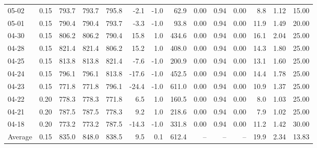 \begin{threeparttable}
{\begin{tabular}{lrrrrrrrrrrrrr}
  05-02 &     0.15 & 793.7 &  793.7 & 795.8 &       -2.1 &                     -1.0 &                62.9 &       0.00 &      0.94 &           0.00 &              8.8 &            1.12 &                  15.00 \\
  05-01 &     0.15 & 790.4 &  790.4 & 793.7 &       -3.3 &                     -1.0 &                93.8 &       0.00 &      0.94 &           0.00 &             11.9 &            1.49 &                  20.00 \\
  04-30 &     0.15 & 806.2 &  806.2 & 790.4 &       15.8 &                      1.0 &               434.6 &       0.00 &      0.94 &           0.00 &             16.1 &            2.04 &                  25.00 \\
  04-28 &     0.15 & 821.4 &  821.4 & 806.2 &       15.2 &                      1.0 &               408.0 &       0.00 &      0.94 &           0.00 &             14.3 &            1.80 &                  25.00 \\
  04-25 &     0.15 & 813.8 &  813.8 & 821.4 &       -7.6 &                     -1.0 &               200.9 &       0.00 &      0.94 &           0.00 &             13.1 &            1.60 &                  25.00 \\
  04-24 &     0.15 & 796.1 &  796.1 & 813.8 &      -17.6 &                     -1.0 &               452.5 &       0.00 &      0.94 &           0.00 &             14.4 &            1.78 &                  25.00 \\
  04-23 &     0.15 & 771.8 &  771.8 & 796.1 &      -24.4 &                     -1.0 &               611.0 &       0.00 &      0.94 &           0.00 &             10.9 &            1.37 &                  25.00 \\
  04-22 &     0.20 & 778.3 &  778.3 & 771.8 &        6.5 &                      1.0 &               160.5 &       0.00 &      0.94 &           0.00 &              8.0 &            1.03 &                  25.00 \\
  04-21 &     0.20 & 787.5 &  787.5 & 778.3 &        9.2 &                      1.0 &               218.6 &       0.00 &      0.94 &           0.00 &              7.9 &            1.02 &                  25.00 \\
  04-18 &     0.20 & 773.2 &  773.2 & 787.5 &      -14.3 &                     -1.0 &               331.8 &       0.00 &      0.94 &           0.00 &             11.2 &            1.42 &                  30.00 \\
Average &     0.15 & 835.0 &  848.0 & 838.5 &        9.5 &                      0.1 &               612.4 &         -- &        -- &             -- &             19.9 &            2.34 &                  13.83 \\

\end{tabular}}
\end{threeparttable}
